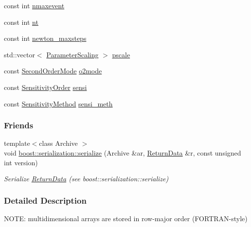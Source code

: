 \begin{DoxyCompactItemize}
\item 
const int \mbox{\hyperlink{classamici_1_1_return_data_a48832d4f3a37c4fd75cc7f4ef578d1b1}{nmaxevent}}
\item 
const int \mbox{\hyperlink{classamici_1_1_return_data_a21dcbe77c07eeefce79fcacdbe5f1262}{nt}}
\item 
const int \mbox{\hyperlink{classamici_1_1_return_data_a871e64bbfbd5881a86f21aaff42c3dec}{newton\+\_\+maxsteps}}
\item 
std\+::vector$<$ \mbox{\hyperlink{namespaceamici_a42f062082226e9284c201d9eab71a3a0}{Parameter\+Scaling}} $>$ \mbox{\hyperlink{classamici_1_1_return_data_a5d1c7237dc998202fe1b3393b50f77ce}{pscale}}
\item 
const \mbox{\hyperlink{namespaceamici_a2d77779286167d5603a870bf9f6c21ba}{Second\+Order\+Mode}} \mbox{\hyperlink{classamici_1_1_return_data_acc235cad50283f7891e2d834f1cbeb90}{o2mode}}
\item 
const \mbox{\hyperlink{namespaceamici_aaa03ec2f8c4d5323b98d71134a462fda}{Sensitivity\+Order}} \mbox{\hyperlink{classamici_1_1_return_data_ae273fd99697cf0308e7471d822c22d7f}{sensi}}
\item 
const \mbox{\hyperlink{namespaceamici_aa0fa493529f6872e7e776b91fbbf38f9}{Sensitivity\+Method}} \mbox{\hyperlink{classamici_1_1_return_data_ab761d3023398d7f741a0cfc342dc29f5}{sensi\+\_\+meth}}
\end{DoxyCompactItemize}
\subsubsection*{Friends}
\begin{DoxyCompactItemize}
\item 
{\footnotesize template$<$class Archive $>$ }\\void \mbox{\hyperlink{classamici_1_1_return_data_af3646925990e46131d1bc92b5a7c0dc4}{boost\+::serialization\+::serialize}} (Archive \&ar, \mbox{\hyperlink{classamici_1_1_return_data}{Return\+Data}} \&r, const unsigned int version)
\begin{DoxyCompactList}\small\item\em Serialize \mbox{\hyperlink{classamici_1_1_return_data}{Return\+Data}} (see boost\+::serialization\+::serialize) \end{DoxyCompactList}\end{DoxyCompactItemize}


\subsubsection{Detailed Description}
N\+O\+TE\+: multidimensional arrays are stored in row-\/major order (F\+O\+R\+T\+R\+A\+N-\/style) 

